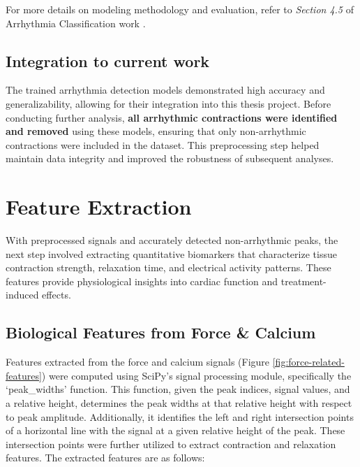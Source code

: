 \documentclass{report}
\begin{document}
            For more details on modeling methodology and evaluation, refer to \textit{Section 4.5} of Arrhythmia Classification work \cite{Sarwar2024}.
            \subsection{Integration to current work}
            
            The trained arrhythmia detection models demonstrated high accuracy and generalizability, allowing for their integration into this thesis project. Before conducting further analysis, \textbf{all arrhythmic contractions were identified and removed} using these models, ensuring that only non-arrhythmic contractions were included in the dataset. This preprocessing step helped maintain data integrity and improved the robustness of subsequent analyses.


    \newpage
    \section{Feature Extraction}
        \label{feature-extraction}
        With preprocessed signals and accurately detected non-arrhythmic peaks, the next step involved extracting quantitative biomarkers that characterize tissue contraction strength, relaxation time, and electrical activity patterns. These features provide physiological insights into cardiac function and treatment-induced effects.
        
        \subsection{Biological Features from Force \& Calcium}
        \label{force-peak-detection}
            Features extracted from the force and calcium signals (Figure \ref{fig:force-related-features}) were computed using SciPy’s signal processing module, specifically the `peak\_widths' \cite{SciPy_peak_widths} function. This function, given the peak indices, signal values, and a relative height, determines the peak widths at that relative height with respect to peak amplitude. Additionally, it identifies the left and right intersection points of a horizontal line with the signal at a given relative height of the peak. These intersection points were further utilized to extract contraction and relaxation features. The extracted features are as follows:
            
\end{document}
